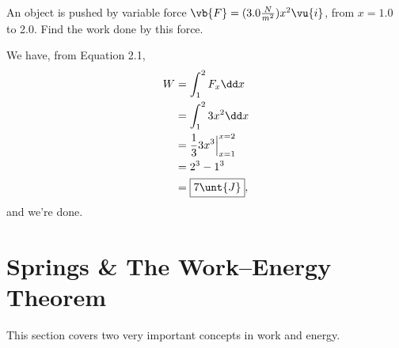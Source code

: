 \documentclass[11pt]{article}
\begin{document}
\begin{example}
	An object is pushed by variable force $\vb{F} = (3.0 \frac{N}{m^2}) x^2\vu{i}$, from $x = 1.0$ to 2.0. Find the work done by this force.
\end{example}
\begin{solution}
	We have, from Equation 2.1,
	\begin{align*}
		W &= \int_{1}^{2} F_x\dd x \\
		&= \int_1^2 3x^2 \dd x \\
		&= \frac{1}{3}3x^3 \Big|_{x=1}^{x = 2} \\
		&= 2^3 - 1^3 \\
		&= \boxed{7 \unt{J}},
	\end{align*}
	and we're done.
\end{solution}

\section{Springs \& The Work--Energy Theorem}
This section covers two very important concepts in work and energy.
\end{document}
